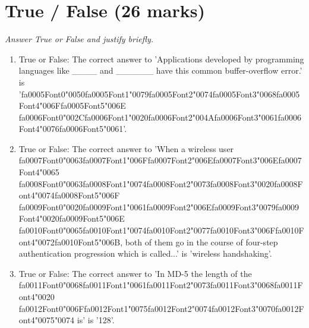 \documentclass[12pt]{article}
\begin{document}
\section*{True / False (26 marks)}
\textit{Answer True or False and justify briefly.}
\begin{enumerate}[label=\arabic*.]
\item True or False: The correct answer to 'Applications developed by programming languages like \_\_\_\_ and \_\_\_\_\_\_ have this common buffer-overflow error.' is '{\csname fa0005Font0\endcsname\char"0050}{\csname fa0005Font1\endcsname\char"0079}{\csname fa0005Font2\endcsname\char"0074}{\csname fa0005Font3\endcsname\char"0068}{\csname fa0005Font4\endcsname\char"006F}{\csname fa0005Font5\endcsname\char"006E} {\csname fa0006Font0\endcsname\char"002C}{\csname fa0006Font1\endcsname\char"0020}{\csname fa0006Font2\endcsname\char"004A}{\csname fa0006Font3\endcsname\char"0061}{\csname fa0006Font4\endcsname\char"0076}{\csname fa0006Font5\endcsname\char"0061}'.
\item True or False: The correct answer to 'When a wireless user {\csname fa0007Font0\endcsname\char"0063}{\csname fa0007Font1\endcsname\char"006F}{\csname fa0007Font2\endcsname\char"006E}{\csname fa0007Font3\endcsname\char"006E}{\csname fa0007Font4\endcsname\char"0065} {\csname fa0008Font0\endcsname\char"0063}{\csname fa0008Font1\endcsname\char"0074}{\csname fa0008Font2\endcsname\char"0073}{\csname fa0008Font3\endcsname\char"0020}{\csname fa0008Font4\endcsname\char"0074}{\csname fa0008Font5\endcsname\char"006F} {\csname fa0009Font0\endcsname\char"0020}{\csname fa0009Font1\endcsname\char"0061}{\csname fa0009Font2\endcsname\char"006E}{\csname fa0009Font3\endcsname\char"0079}{\csname fa0009Font4\endcsname\char"0020}{\csname fa0009Font5\endcsname\char"006E} {\csname fa0010Font0\endcsname\char"0065}{\csname fa0010Font1\endcsname\char"0074}{\csname fa0010Font2\endcsname\char"0077}{\csname fa0010Font3\endcsname\char"006F}{\csname fa0010Font4\endcsname\char"0072}{\csname fa0010Font5\endcsname\char"006B}, both of them go in the course of four-step authentication progression which is called...' is 'wireless handshaking'.
\item True or False: The correct answer to 'In MD-5 the length of the {\csname fa0011Font0\endcsname\char"0068}{\csname fa0011Font1\endcsname\char"0061}{\csname fa0011Font2\endcsname\char"0073}{\csname fa0011Font3\endcsname\char"0068}{\csname fa0011Font4\endcsname\char"0020} {\csname fa0012Font0\endcsname\char"006F}{\csname fa0012Font1\endcsname\char"0075}{\csname fa0012Font2\endcsname\char"0074}{\csname fa0012Font3\endcsname\char"0070}{\csname fa0012Font4\endcsname\char"0075}{\char"0074} is' is '128'.

\end{enumerate}
\end{document}
